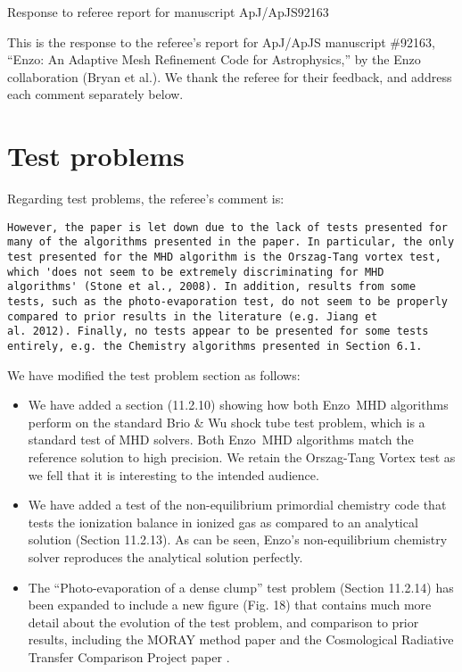 \documentclass[11pt]{article}
\newcommand{\code}[1]{\textsf{#1}}
\newcommand{\enzo}{\code{Enzo}}
\begin{document}
\begin{center} 
\bfseries{
\begin{large}
Response to referee report for manuscript  ApJ/ApJS92163
\end{large}
}
\end{center}



This is the response to the referee's report for ApJ/ApJS manuscript
\#92163, ``Enzo: An Adaptive Mesh Refinement Code for Astrophysics,''
by the Enzo collaboration (Bryan et al.).  We thank the referee for
their feedback, and address each comment separately below.

\section{Test problems}

Regarding test problems, the referee's comment is:

\begin{verbatim}
However, the paper is let down due to the lack of tests presented for
many of the algorithms presented in the paper. In particular, the only
test presented for the MHD algorithm is the Orszag-Tang vortex test,
which 'does not seem to be extremely discriminating for MHD
algorithms' (Stone et al., 2008). In addition, results from some
tests, such as the photo-evaporation test, do not seem to be properly
compared to prior results in the literature (e.g. Jiang et
al. 2012). Finally, no tests appear to be presented for some tests
entirely, e.g. the Chemistry algorithms presented in Section 6.1.
\end{verbatim}

We have modified the test problem section as follows:

\begin{itemize}
\item We have added a section (11.2.10) showing how both \enzo\ MHD
  algorithms perform on the standard Brio \& Wu shock tube test
  problem, which is a standard test of MHD solvers.  Both \enzo\ MHD
  algorithms match the reference solution to high precision.  We retain the
  Orszag-Tang Vortex test as we fell that it is interesting to the
  intended audience.

\item We have added a test of the non-equilibrium primordial chemistry code that
  tests the ionization balance in ionized gas as compared to an
  analytical solution (Section 11.2.13).  As can be seen, \enzo's
  non-equilibrium chemistry solver  reproduces the analytical solution perfectly.

\item The ``Photo-evaporation of a dense clump'' test problem (Section
  11.2.14) has been expanded to include a new figure (Fig. 18) that
  contains much more detail about the evolution of the test problem,
  and comparison to prior results, including the MORAY method paper
  \citep{Wise11_Moray} and the Cosmological Radiative Transfer
  Comparison Project paper \citep{IlievEtAl2009}.

\end{itemize}
\end{document}
